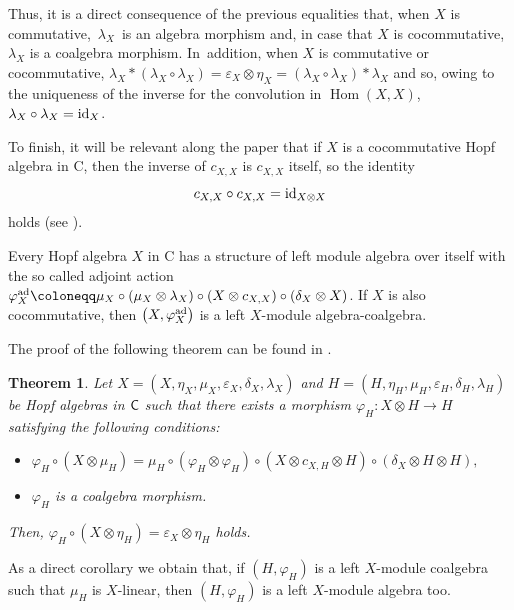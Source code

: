 \documentclass[pdftex]{sigma}
\numberwithin{equation}{section}
\newtheorem{Theorem}{Theorem}[section]
\DeclareMathOperator{\Hom}{Hom}
\begin{document}
\begin{Definition}
Thus, it is a direct consequence of the previous equalities that, when $X$ is commutative,~$\lambda_{X}$~is an algebra morphism and, in case that $X$ is cocommutative, $\lambda_{X}$ is a coalgebra morphism. In~addition, when $X$ is commutative or cocommutative, $\lambda_{X}\ast(\lambda_{X}\circ\lambda_{X})=\varepsilon_{X}\otimes\eta_{X}=(\lambda_{X}\circ\lambda_{X})\ast\lambda_{X}$ and so, owing to the uniqueness of the inverse for the convolution in $\Hom(X,X)$, $\lambda_{X}\circ\lambda_{X}={\rm id}_{X}$.

To finish, it will be relevant along the paper that if $X$ is a cocommutative Hopf algebra in {\sf C}, then the inverse of $c_{X,X}$ is $c_{X,X}$ itself, so the identity
\begin{equation}
\label{ccb}
c_{X,X}\circ c_{X,X}={\rm id}_{X\otimes X}
\end{equation}
holds (see \cite[Corollary 5]{Sch}).
\end{Definition}
\begin{Remark}
Every Hopf algebra $X$ in {\sf C} has a structure of left module algebra over itself with the so called adjoint action $\varphi_{X}^{{\rm ad}}\coloneqq \mu_{X}\circ(\mu_{X}\otimes\lambda_{X})\circ(X\otimes c_{X,X})\circ(\delta_{X}\otimes X)$. If $X$ is also cocommutative, then $\bigl(X,\varphi_{X}^{{\rm ad}}\bigr)$ is a left $X$-module algebra-coalgebra.
\end{Remark}
The proof of the following theorem can be found in \cite[Theorem 1.8]{FGR}.
\begin{Theorem}\label{th.interest}\samepage
Let $X=(X,\eta_{X},\mu_{X},\varepsilon_{X},\delta_{X},\lambda_{X})$ and $H=(H,\eta_{H},\mu_{H},\varepsilon_{H},\delta_{H},\lambda_{H})$ be Hopf algebras in $\sf{C}$ such that there exists a morphism $\varphi_{H}\colon X\otimes H\rightarrow H$ satisfying the following conditions:
\begin{itemize}\itemsep=0pt
\item[$(i)$] $\varphi_{H}\circ(X\otimes\mu_{H})=\mu_{H}\circ(\varphi_{H}\otimes\varphi_{H})\circ(X\otimes c_{X,H}\otimes H)\circ(\delta_{X}\otimes H\otimes H),$
\item[$(ii)$] $\varphi_{H}$ is a coalgebra morphism.
\end{itemize}
Then, $\varphi_{H}\circ(X\otimes\eta_{H})=\varepsilon_{X}\otimes\eta_{H}$ holds.
\end{Theorem}
As a direct corollary we obtain that, if $(H,\varphi_{H})$ is a left $X$-module coalgebra such that $\mu_{H}$ is $X$-linear, then $(H,\varphi_{H})$ is a left $X$-module algebra too.
\end{document}

